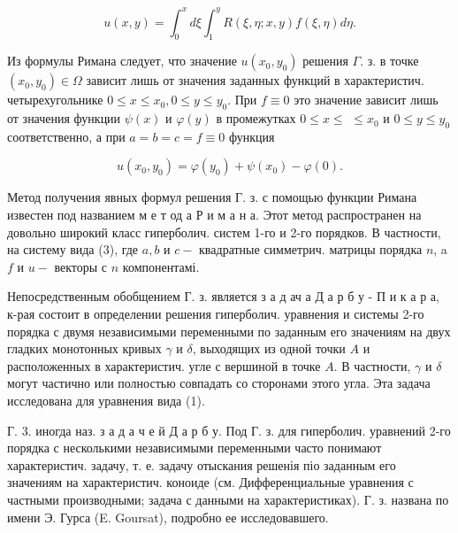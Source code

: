 \documentclass[10pt]{article}
\begin{document}
\[

u(x, y)=\int_{0}^{x} d \xi \int_{1}^{y} R(\xi, \eta ; x, y) f(\xi, \eta) d \eta .

\]



Из формулы Римана следует, что значение $u\left(x_{0}, y_{0}\right)$ решения $\Gamma$. з. в точке $\left(x_{0}, y_{0}\right) \in \Omega$ зависит лишь от значения заданных функций в характеристич. четырехугольнике $0 \leqslant x \leqslant x_{0}, 0 \leqslant y \leqslant y_{0}$. При $f \equiv 0$ это значение зависит лишь от значения функции $\psi(x)$ и $\varphi(y)$ в промежутках $0 \leqslant x \leqslant$ $\leqslant x_{0}$ и $0 \leqslant y \leqslant y_{0}$ соответственно, а при $a=b=c=f \equiv 0$ функция



\[

u\left(x_{0}, y_{0}\right)=\varphi\left(y_{0}\right)+\psi\left(x_{0}\right)-\varphi(0) .

\]



Метод получения явных формул решения Г. з. с помощью функции Римана известен под названием м е т од а Р и м а н а. Этот метод распространен на довольно широкий класс гиперболич. систем 1-го и 2-го порядков. В частности, на систему вида (3), где $a, b$ и $c-$ квадратные симметрич. матрицы порядка $n$, a $f$ и $u-$ векторы с $n$ компонентамі.



Непосредственным обобщением $Г$. з. является з а д ач а Д а р б у - П и к а р а, к-рая состоит в определении решения гиперболич. уравнения и системы 2-го порядка с двумя независимыми переменными по заданным его значениям на двух гладких монотонных кривых $\gamma$ и $\delta$, выходящих из одной точки $A$ и расположенных в характеристич. угле с вершиной в точке $A$. В частности, $\gamma$ и $\delta$ могут частично или полностью совпадать со сторонами этого угла. Эта задача исследована для уравнения вида (1).



Г. 3. иногда наз. з а д а ч е й Д а р б у. Под Г. $з$. для гиперболич. уравнений 2-го порядка с несколькими независимыми переменными часто понимают характеристич. задачу, т. е. задачу отыскания решенія піо заданным его значениям на характеристич. коноиде (см. Дифференциальные уравнения с частными производными; задача с данными на характеристиках). Г. з. названа по имени Э. Гурса (E. Goursat), подробно ее исследовавшего.
\end{document}
